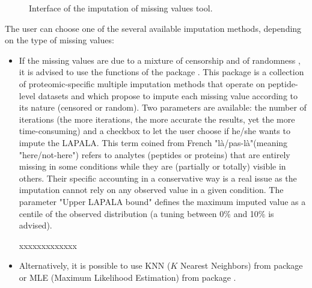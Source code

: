 \documentclass[12pt]{article}
\begin{document}
{\begin {figure}
\centering
{}
\caption{Interface of the imputation of missing values tool.}\label{fig:impu}
\end {figure}

The user can choose one of the several available imputation methods, depending 
on the type of missing values:
\begin{itemize}
\item If the missing values are due to a mixture of censorship and of randomness
, it is advised to use the functions of the package . This 
package is a collection of proteomic-specific 
multiple imputation methods that operate on peptide-level datasets and which 
propose to impute each missing value according to its nature (censored or 
random). Two parameters are available: the number of iterations (the more 
iterations, the more accurate the results, yet the more time-consuming) and a 
checkbox to let the user choose if he/she wants to impute the LAPALA. This
term coined from French "là/pas-là"(meaning "here/not-here") refers to analytes 
(peptides or proteins) that are entirely missing in some conditions while they
are (partially or totally) visible in others. Their specific accounting in a 
conservative way is a real issue as the imputation cannot rely on any observed 
value in a given condition. The parameter "Upper LAPALA bound" defines the 
maximum imputed value as a centile of the observed distribution (a tuning 
between 0\% and 10\% is advised).

xxxxxxxxxxxxx

\item Alternatively, it is possible to use KNN ($K$ Nearest Neighbors) from package 
 or MLE (Maximum Likelihood Estimation) from package 
.
\end{itemize}


}
\end{document}
